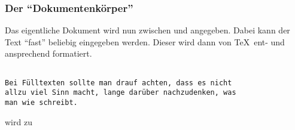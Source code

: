 \begin{frame}[fragile]
  \frametitle{Der \enquote{Dokumentenkörper}}

  Das eigentliche Dokument wird nun zwischen \lstinline!! und
    \lstinline!! angegeben.  Dabei kann der Text \enquote{fast} beliebig
  eingegeben werden.  Dieser wird dann von \TeX\ ent- und ansprechend formatiert.

\begin{lstlisting}

Bei Fülltexten sollte man drauf achten, dass es nicht
allzu viel Sinn macht, lange darüber nachzudenken, was
man wie schreibt.

\end{lstlisting}

  wird zu







\end{frame}

